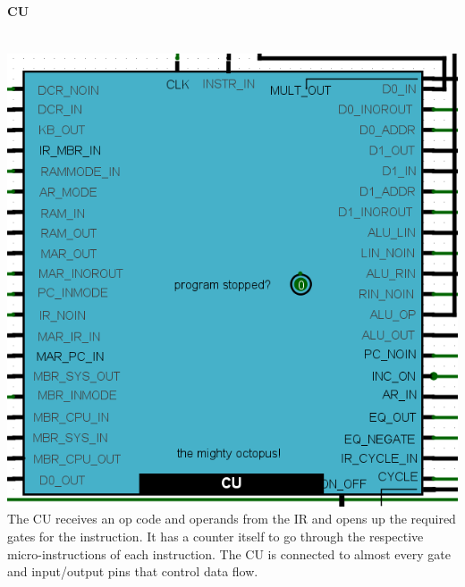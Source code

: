 \documentclass{mcgillhomework}
\begin{document}
	\paragraph{CU}~
	\\ \includegraphics[scale=0.5]{CU}\\The CU receives an op code and operands from the IR and opens up the required gates for the instruction. It has a counter itself to go through the respective micro-instructions of each instruction. The CU is connected to almost every gate and input/output pins that control data flow.
\end{document}
